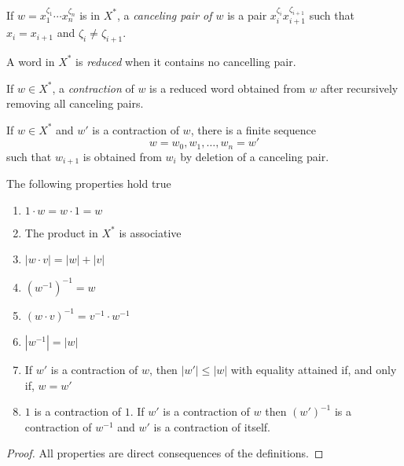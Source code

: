 \begin{defns}
    If $w=x_1^{\zeta_1}\cdots x_n^{\zeta_n}$ is in $X^*$, a \textsl{canceling pair of\/ $w$} is a pair\/ $x_i^{\zeta_i}x_{i+1}^{\zeta_{i+1}}$ such that\/ $x_i=x_{i+1}$ and\/ $\zeta_i\ne\zeta_{i+1}$.

    A word in $X^*$ is \textsl{reduced} when it contains no cancelling pair.

    If\/ $w\in X^*$, a \textsl{contraction} of\/ $w$ is a reduced word obtained from\/ $w$ after recursively removing all canceling pairs.
\end{defns}

\begin{rem}\label{rem:cancel-insert-sequence}
    If $w\in X^*$ and $w'$ is a contraction of $w$, there is a finite sequence
    $$
        w=w_0,w_1,\dots,w_n=w'
    $$
    such that $w_{i+1}$ is obtained from $w_i$ by deletion of a canceling pair.
\end{rem}

\begin{lem}\label{word-properties} The following properties hold true
    \begin{enumerate}[\rm a)]
        \item $1\cdot w=w\cdot1=w$
        \item The product in $X^*$ is associative
        \item $|w\cdot v|=|w|+|v|$
        \item $(w^{-1})^{-1}=w$
        \item $(w\cdot v)^{-1}=v^{-1}\cdot w^{-1}$
        \item $|w^{-1}|=|w|$
        \item If $w'$ is a contraction of $w$, then $|w'|\le|w|$ with equality attained if, and only if, $w=w'$
        \item $1$ is a contraction of $1$. If $w'$ is a contraction of $w$ then $(w')^{-1}$ is a contraction of $w^{-1}$\/ and\/ $w'$ is a contraction of itself.
    \end{enumerate}
\end{lem}

\begin{proof}
    All properties are direct consequences of the definitions.
\end{proof}


